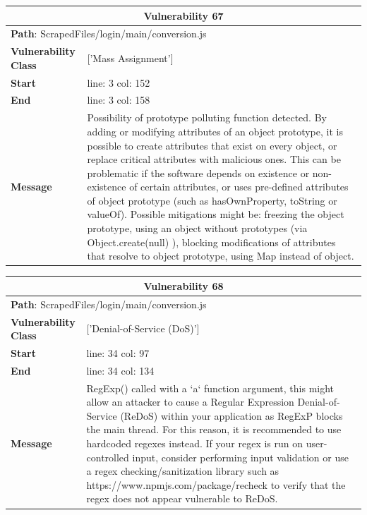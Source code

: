 \documentclass[12pt]{article}
\begin{document}
\vspace{0.7cm}
\FloatBarrier
\begin{table}[!h]
\centering
\renewcommand{\arraystretch}{1.3}
\begin{tabular}{|l|p{10cm}|}
\hline
\multicolumn{2}{|c|}{\textbf{Vulnerability 67}} \\
\hline
\multicolumn{2}{|l|}{\textbf{Path}: ScrapedFiles/login/main/conversion.js} \\
\hline
\textbf{Vulnerability Class} & ['Mass Assignment'] \\
\hline
\textbf{Start} & line: 3 \quad col: 152 \\
\hline
\textbf{End} & line: 3 \quad col: 158 \\
\hline
\textbf{Message} & Possibility of prototype polluting function detected. By adding or modifying attributes of an object prototype, it is possible to create attributes that exist on every object, or replace critical attributes with malicious ones. This can be problematic if the software depends on existence or non-existence of certain attributes, or uses pre-defined attributes of object prototype (such as hasOwnProperty, toString or valueOf). Possible mitigations might be: freezing the object prototype, using an object without prototypes (via Object.create(null) ), blocking modifications of attributes that resolve to object prototype, using Map instead of object. \\
\hline
\end{tabular}
\end{table}
\vspace{0.7cm}
\FloatBarrier
\begin{table}[!h]
\centering
\renewcommand{\arraystretch}{1.3}
\begin{tabular}{|l|p{10cm}|}
\hline
\multicolumn{2}{|c|}{\textbf{Vulnerability 68}} \\
\hline
\multicolumn{2}{|l|}{\textbf{Path}: ScrapedFiles/login/main/conversion.js} \\
\hline
\textbf{Vulnerability Class} & ['Denial-of-Service (DoS)'] \\
\hline
\textbf{Start} & line: 34 \quad col: 97 \\
\hline
\textbf{End} & line: 34 \quad col: 134 \\
\hline
\textbf{Message} & RegExp() called with a `a` function argument, this might allow an attacker to cause a Regular Expression Denial-of-Service (ReDoS) within your application as RegExP blocks the main thread. For this reason, it is recommended to use hardcoded regexes instead. If your regex is run on user-controlled input, consider performing input validation or use a regex checking/sanitization library such as https://www.npmjs.com/package/recheck to verify that the regex does not appear vulnerable to ReDoS. \\
\hline
\end{tabular}
\end{table}
\end{document}
